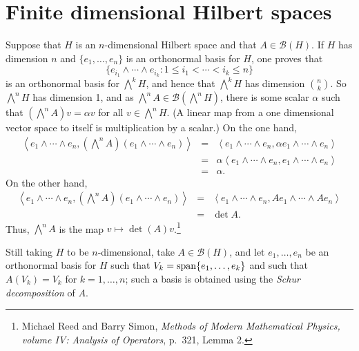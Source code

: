 \documentclass{article}
\newcommand{\inner}[2]{\left\langle #1, #2 \right\rangle}
\newcommand{\Span}{\ensuremath\mathrm{span}}
\theoremstyle{definition}
\begin{document}
\section{Finite dimensional Hilbert spaces}
Suppose that $H$ is an $n$-dimensional Hilbert space and that $A \in \mathscr{B}(H)$.
If $H$ has dimension $n$ and $\{e_1,\ldots,e_n\}$ is an orthonormal basis for $H$, one proves that
\[
\{e_{i_1} \wedge \cdots \wedge e_{i_k}: 1 \leq i_1 < \cdots <i_k \leq n\}
\]
is an orthonormal basis for $\bigwedge^k H$, and hence that 
$\bigwedge^k H$ has dimension $\binom{n}{k}$. So $\bigwedge^n H$ has dimension 1, and
as $\bigwedge^n A \in \mathscr{B}(\bigwedge^n H)$, there is some scalar $\alpha$ such that
$(\bigwedge^n A) v = \alpha v$ for all $v \in \bigwedge^n H$. (A linear map from a one dimensional vector space to itself
is multiplication by a scalar.)  On the one hand,
\begin{eqnarray*}
\inner{e_1 \wedge \cdots \wedge e_n}{\textstyle{(\bigwedge^n A)}(e_1 \wedge \cdots \wedge e_n)}&=&\inner{e_1 \wedge \cdots \wedge e_n}{\alpha e_1 \wedge \cdots \wedge e_n}\\
&=&\alpha \inner{e_1 \wedge \cdots \wedge e_n}{e_1 \wedge \cdots \wedge e_n}\\
&=&\alpha.
\end{eqnarray*}
On the other hand,
\begin{eqnarray*}
\inner{e_1 \wedge \cdots \wedge e_n}{\textstyle{(\bigwedge^n A)}(e_1 \wedge \cdots \wedge e_n)}&=&\inner{e_1 \wedge \cdots \wedge e_n}{Ae_1 \wedge \cdots \wedge Ae_n}\\
&=&\det A.
\end{eqnarray*}
Thus, $\bigwedge^n A$ is the map $v \mapsto \det(A)v$.\footnote{Michael
Reed and Barry Simon, {\em Methods of Modern Mathematical Physics, volume IV: Analysis of Operators}, p.~321, Lemma 2.}

Still taking $H$ to be $n$-dimensional, take $A \in \mathscr{B}(H)$, and let
$e_1,\ldots,e_n$ be an orthonormal basis for $H$ such that $V_k=\Span\{e_1,\ldots,e_k\}$ and such that
$A(V_k)=V_k$ for $k=1,\ldots,n$; such a basis is obtained using the {\em Schur decomposition} of $A$.
\end{document}
